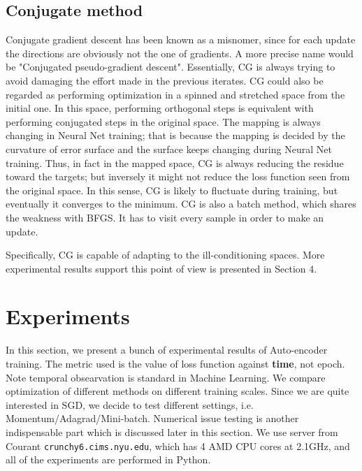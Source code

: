 \documentclass{article} %
\begin{document}
\subsection{Conjugate method}
Conjugate gradient descent has been known as a misnomer, since for each update the directions are obviously not the one of gradients. A more precise name would be "Conjugated pseudo-gradient descent". Essentially, CG is always trying to avoid damaging the effort made in the previous iterates. CG could also be regarded as performing optimization in a spinned and stretched space from the initial one. In this space, performing orthogonal steps is equivalent with performing conjugated steps in the original space. The mapping is always changing in Neural Net training; that is because the mapping is decided by the curvature of error surface and the surface keeps changing during Neural Net training. Thus, in fact in the mapped space, CG is always reducing the residue toward the targets; but inversely it might not reduce the loss function seen from the original space. In this sense, CG is likely to fluctuate during training, but eventually it converges to the minimum. CG is also a batch method, which shares the weakness with BFGS. It has to visit every sample in order to make an update.

Specifically, CG is capable of adapting to the ill-conditioning spaces. More experimental results support this point of view is presented in Section 4.

\section{Experiments}

In this section, we present a bunch of experimental results of Auto-encoder training. The metric used is the value of loss function against {\bf time}, not epoch. Note temporal obsearvation is standard in Machine Learning. We compare optimization of different methods on different training scales. Since we are quite interested in SGD, we decide to test different settings, i.e. Momentum/Adagrad/Mini-batch. Numerical issue testing is another indispensable part which is discussed later in this section. We use server from Courant \texttt{crunchy6.cims.nyu.edu}, which has 4 AMD CPU cores at 2.1GHz, and all of the experiments are performed in Python.
\end{document}
